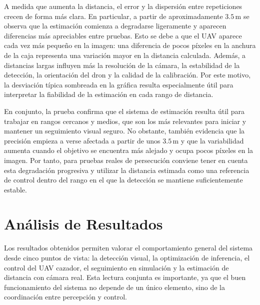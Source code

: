 \vspace{0.2cm}

A medida que aumenta la distancia, el error y la dispersión entre repeticiones crecen de forma más clara. En particular, a partir de aproximadamente $3.5\,\mathrm{m}$ se observa que la estimación comienza a degradarse ligeramente y aparecen diferencias más apreciables entre pruebas. Esto se debe a que el UAV aparece cada vez más pequeño en la imagen: una diferencia de pocos píxeles en la anchura de la caja representa una variación mayor en la distancia calculada. Además, a distancias largas influyen más la resolución de la cámara, la estabilidad de la detección, la orientación del dron y la calidad de la calibración. Por este motivo, la desviación típica sombreada en la gráfica resulta especialmente útil para interpretar la fiabilidad de la estimación en cada rango de distancia.

\vspace{0.2cm}

En conjunto, la prueba confirma que el sistema de estimación resulta útil para trabajar en rangos cercanos y medios, que son los más relevantes para iniciar y mantener un seguimiento visual seguro. No obstante, también evidencia que la precisión empieza a verse afectada a partir de unos $3.5\,\mathrm{m}$ y que la variabilidad aumenta cuando el objetivo se encuentra más alejado y ocupa pocos píxeles en la imagen. Por tanto, para pruebas reales de persecución conviene tener en cuenta esta degradación progresiva y utilizar la distancia estimada como una referencia de control dentro del rango en el que la detección se mantiene suficientemente estable.

\vspace{0.2cm}




\section{Análisis de Resultados}

Los resultados obtenidos permiten valorar el comportamiento general del sistema desde cinco puntos de vista: la detección visual, la optimización de inferencia, el control del UAV cazador, el seguimiento en simulación y la estimación de distancia con cámara real. Esta lectura conjunta es importante, ya que el buen funcionamiento del sistema no depende de un único elemento, sino de la coordinación entre percepción y control.

\vspace{0.2cm}

